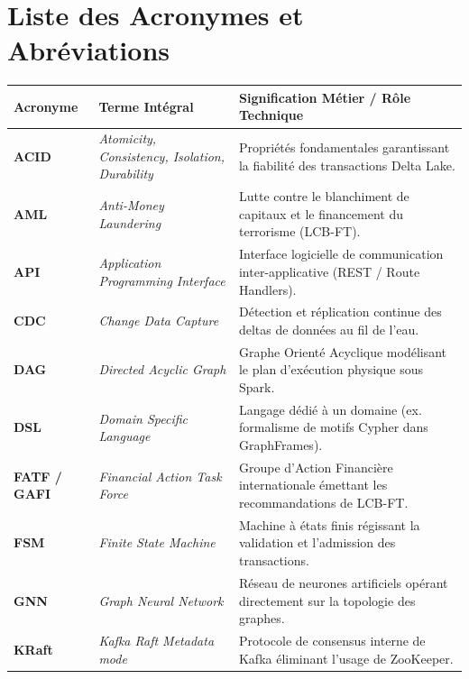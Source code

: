 
\chapter*{Liste des Acronymes et Abréviations}

\begin{table}[htbp]
\centering
\small
\renewcommand{\arraystretch}{1.08}
\begin{tabularx}{\textwidth}{l p{4.8cm} X}
\toprule
\textbf{Acronyme} & \textbf{Terme Intégral} & \textbf{Signification Métier / Rôle Technique} \\
\midrule
\textbf{ACID} & \textit{Atomicity, Consistency, Isolation, Durability} & Propriétés fondamentales garantissant la fiabilité des transactions Delta Lake. \\
\textbf{AML} & \textit{Anti-Money Laundering} & Lutte contre le blanchiment de capitaux et le financement du terrorisme (LCB-FT). \\
\textbf{API} & \textit{Application Programming Interface} & Interface logicielle de communication inter-applicative (REST / Route Handlers). \\
\textbf{CDC} & \textit{Change Data Capture} & Détection et réplication continue des deltas de données au fil de l'eau. \\
\textbf{DAG} & \textit{Directed Acyclic Graph} & Graphe Orienté Acyclique modélisant le plan d'exécution physique sous Spark. \\
\textbf{DSL} & \textit{Domain Specific Language} & Langage dédié à un domaine (ex. formalisme de motifs Cypher dans GraphFrames). \\
\textbf{FATF / GAFI} & \textit{Financial Action Task Force} & Groupe d'Action Financière internationale émettant les recommandations de LCB-FT. \\
\textbf{FSM} & \textit{Finite State Machine} & Machine à états finis régissant la validation et l'admission des transactions. \\
\textbf{GNN} & \textit{Graph Neural Network} & Réseau de neurones artificiels opérant directement sur la topologie des graphes. \\
\textbf{KRaft} & \textit{Kafka Raft Metadata mode} & Protocole de consensus interne de Kafka éliminant l'usage de ZooKeeper. \\

\end{tabularx}
\end{table}
